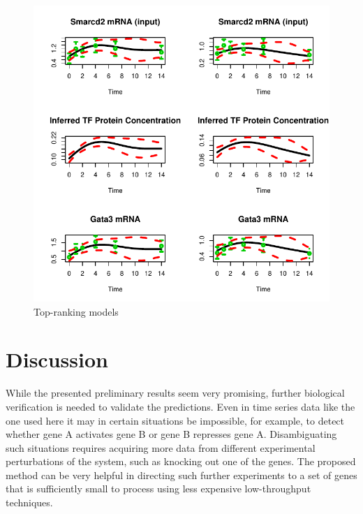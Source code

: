\documentclass{article}
\begin{document}
\begin{figure}[htb]
  \centering
  \includegraphics[width=\columnwidth]{gpdisim_Smarcd2_Gata3}
  \caption{Top-ranking models}
  \label{fig:model5}
\end{figure}

\section{Discussion}

While the presented preliminary results seem very promising, further
biological verification is needed to validate the predictions.  Even
in time series data like the one used here it may in certain
situations be impossible, for example, to detect whether gene A
activates gene B or gene B represses gene A.  Disambiguating such
situations requires acquiring more data from different experimental
perturbations of the system, such as knocking out one of the genes.
The proposed method can be very helpful in directing such further
experiments to a set of genes that is sufficiently small to process
using less expensive low-throughput techniques.




\end{document}
